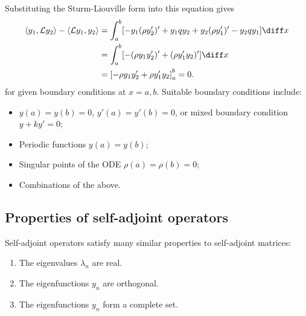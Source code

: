 \documentclass[12pt]{article}
\begin{document}
Substituting the Sturm-Liouville form into this equation gives
\begin{align*}
	\langle y_1, \mathcal{L}y_2 \rangle - \langle \mathcal{L}y_1, y_2 \rangle &= \int_{a}^{b} [-y_1(\rho y_2')' + y_1qy_2 + y_2(\rho y_1')' - y_2 qy_1]\diff x \\
										  &= \int_{a}^{b} [-(\rho y_1 y_2')' + (\rho y_1' y_2)']\diff x \\
										  &= \left[ - \rho y_1 y_2' + \rho y_1' y_2 \right]_{a}^{b} = 0.
\end{align*}
for given boundary conditions at $x = a, b$. Suitable boundary conditions include:
\begin{itemize}
	\item $y(a) = y(b) = 0$, $y'(a) = y'(b) = 0$, or mixed boundary condition $y + ky' = 0$;
	\item Periodic functions $y(a) = y(b)$;
	\item Singular points of the ODE $\rho(a) = \rho(b) = 0$;
	\item Combinations of the above.
\end{itemize}

\subsection{Properties of self-adjoint operators}%
\label{sub:properties_of_self_adjoint_operators}

Self-adjoint operators satisfy many similar properties to self-adjoint matrices:
\begin{enumerate}[1.]
	\item The eigenvalues $\lambda_n$ are real.
	\item The eigenfunctions $y_n$ are orthogonal.
	\item The eigenfunctions $y_n$ form a complete set.
\end{enumerate}
\end{document}
